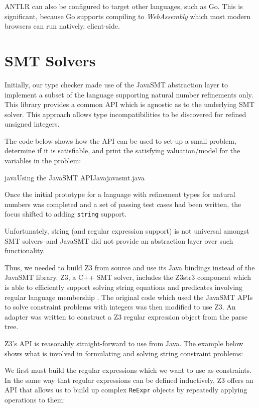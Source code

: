 \documentclass[a4paper,openany,12pt]{book}
\begin{document}
ANTLR can also be configured to target other languages, such as Go.
This is significant, because Go supports compiling to \emph{WebAssembly} which most modern browsers can run natively,
client-side.

\section{SMT Solvers}

Initially, our type checker made use of the JavaSMT abstraction layer to implement a subset of the language
supporting natural number refinements only.
This library provides a common API which is agnostic as to the underlying SMT solver.
This approach allows type incompatibilities to be discovered for refined unsigned integers.

The code below shows how the API can be used to set-up a small problem, determine if it is satisfiable, and print
the satisfying valuation/model for the variables in the problem:

\begin{mycodefile}{java}{Using the JavaSMT API}{Java}{javasmt.java}\end{mycodefile}

Once the initial prototype for a language with refinement types for natural numbers was completed and a set of passing
test cases had been written, the focus shifted to adding \texttt{string} support.

Unfortunately, string (and regular expression support) is not universal amongst SMT solvers--and JavaSMT did not
provide an abstraction layer over such functionality.

Thus, we needed to build Z3 from source and use its Java bindings instead of the JavaSMT library.
Z3, a C++ SMT solver, includes the Z3str3 component which is able to efficiently support solving string equations
and predicates involving regular language membership \citep{berzish2017z3str3}.
The original code which used the JavaSMT APIs to solve constraint problems with integers was then modified to use Z3.
An adapter was written to construct a Z3 regular expression object from the parse tree.

Z3's API is reasonably straight-forward to use from Java.
The example below shows what is involved in formulating and solving string constraint problems:

We first must build the regular expressions which we want to use as constraints.
In the same way that regular expressions can be defined inductively, Z3 offers an API that allows us to build up complex
\texttt{ReExpr} objects by repeatedly applying operations to them:
\end{document}
